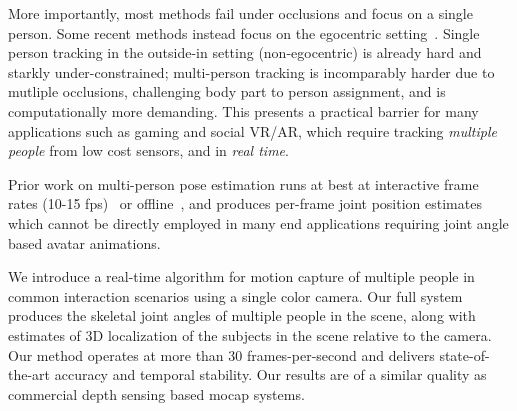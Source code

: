 \documentclass[acmtog,authorversion]{acmart}
\newcommand{\change}[1]{{{#1}}}
\begin{document}
More importantly, most methods fail under occlusions and focus on a single person. \change{Some recent methods instead focus on the egocentric setting~\cite{rhodin_egocap_SIGGRAPHAsia2016,tome2019xr,xu2019mo}.}
Single person tracking \change{in the outside-in setting (non-egocentric)} is already hard and starkly under-constrained; multi-person tracking is incomparably harder due to mutliple occlusions, challenging body part to person assignment, and is computationally more demanding.
This presents a practical barrier for many applications such as gaming and social VR/AR, which require tracking \emph{multiple people} from low cost sensors, and in \emph{real time}.

Prior work on multi-person pose estimation runs at best at interactive frame rates (10-15 fps)~\citep{rogez_lcrpp,dabral2019multi} or offline~\citep{Moon_2019_ICCV_3DMPPE}, and produces per-frame joint position estimates which cannot be directly employed in many end applications requiring joint angle based avatar animations. 

We introduce a real-time algorithm for motion capture of multiple people in common interaction scenarios using a single color camera. Our full system produces the skeletal joint angles of multiple people in the scene, along with estimates of 3D localization of the subjects in the scene relative to the camera. Our method operates at more than 30 frames-per-second and delivers state-of-the-art accuracy and temporal stability. Our results are of a similar quality as commercial depth sensing based mocap systems.
\end{document}
